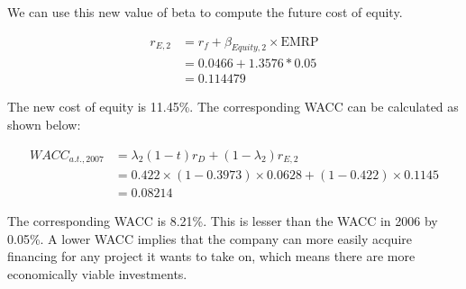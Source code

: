 \documentclass[letterpaper]{article}
\begin{document}
We can use this new value of beta to compute the future cost of equity.

\begin{align*}
r_{E,2} &= r_f + \beta_{Equity, 2} \times \text{EMRP} \\
    &= 0.0466 + 1.3576 * 0.05 \\
    &= 0.114479
\end{align*}

The new cost of equity is 11.45\%. The corresponding WACC can be calculated as shown below:

\begin{align*}
WACC_{a.t., 2007} &= \lambda_2 (1-t) r_D + (1-\lambda_2)r_{E,2} \\
            &= 0.422 \times (1 - 0.3973) \times 0.0628 + (1 - 0.422) \times 0.1145 \\
            &= 0.08214
\end{align*}

The corresponding WACC is 8.21\%. This is lesser than the WACC in 2006 by 0.05\%. A lower WACC implies that the company can more easily acquire financing for any project it wants to take on, which means there are more economically viable investments.
\end{document}
